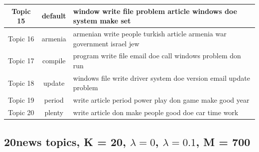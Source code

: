 \documentclass{article}
\begin{document}
\begin{table}[h]
\begin{center}
\begin{tabular}{|c|c|l|}
Topic	15	&	default & window write file problem article windows doe system make set	\\ \hline
Topic	16	&	armenia & armenian write people turkish article armenia war government israel jew	\\ \hline
Topic	17	&	compile & program write file email doe call windows problem don run	\\ \hline
Topic	18	&	update & windows file write driver system doe version email update problem	\\ \hline
Topic	19	&	period & write article period power play don game make good year	\\ \hline
Topic	20	&	plenty & write article don make people good doe car time work	\\ \hline

          \end{tabular}

       \label{tab:M100 topics}
   \end{center}
\vspace{-10pt}
\end{table}

\subsection{20news topics, K = 20, $\lambda=0$, $\lambda=0.1$, M = 700}
\label{appendix:K20-M700}
\end{document}
